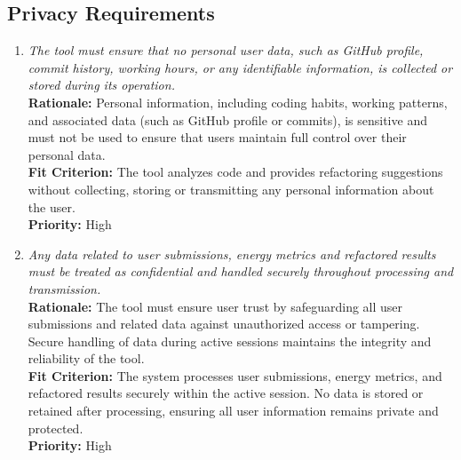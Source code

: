 \documentclass[12pt]{article}
\begin{document}
\subsection{Privacy Requirements}
\begin{enumerate}[label=SR-PR \arabic*., wide=0pt, leftmargin=*]
  \item \emph{The tool must ensure that no personal user data, such
      as GitHub profile, commit history, working hours, or any
      identifiable information, is collected or stored during its
    operation. }\\[2mm]
    {\bf Rationale:} Personal information, including coding habits,
    working patterns, and associated data (such as GitHub profile or
    commits), is sensitive and must not be used to ensure that users
    maintain full control over their personal data.\\
    {\bf Fit Criterion:} The tool analyzes code and provides
    refactoring suggestions without collecting, storing or
    transmitting any personal information about the user.\\
    {\bf Priority:} High
  \item \emph{Any data related to user submissions, energy metrics
      and refactored results must be treated as confidential and
    handled securely throughout processing and transmission.}\\
    {\bf Rationale:} The tool must ensure user trust by safeguarding
    all user submissions and related data against unauthorized access
    or tampering. Secure handling of data during active sessions
    maintains the integrity and reliability of the tool. \\
    {\bf Fit Criterion:} The system processes user submissions,
    energy metrics, and refactored results securely within the active
    session. No data is stored or retained after processing, ensuring
    all user information remains private and protected.\\
    {\bf Priority:} High
\end{enumerate}
\end{document}
